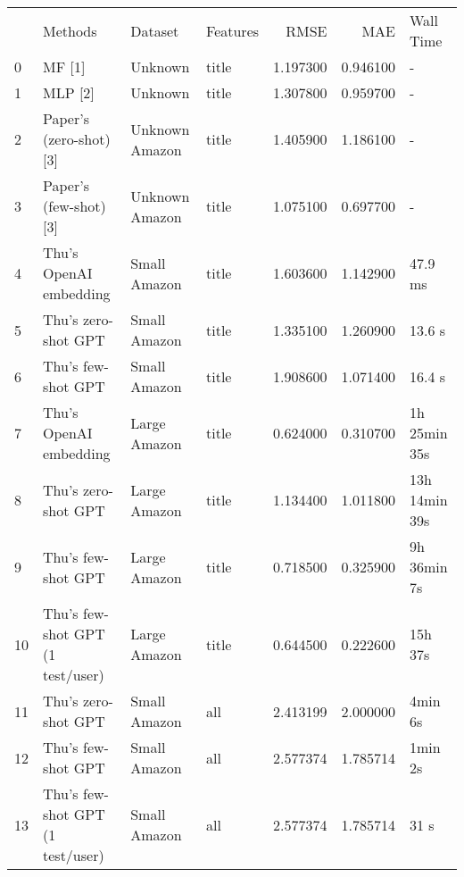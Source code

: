 \begin{tabular}{llllrrl}
 & Methods & Dataset & Features & RMSE & MAE & Wall Time \\
0 & MF [1] & Unknown & title & 1.197300 & 0.946100 & - \\
1 & MLP [2] & Unknown & title & 1.307800 & 0.959700 & - \\
2 & Paper's (zero-shot) [3] & Unknown Amazon & title & 1.405900 & 1.186100 & - \\
3 & Paper's (few-shot) [3] & Unknown Amazon & title & 1.075100 & 0.697700 & - \\
4 & Thu's OpenAI embedding & Small Amazon & title & 1.603600 & 1.142900 & 47.9 ms \\
5 & Thu's zero-shot GPT & Small Amazon & title & 1.335100 & 1.260900 & 13.6 s \\
6 & Thu's few-shot GPT & Small Amazon & title & 1.908600 & 1.071400 & 16.4 s \\
7 & Thu's OpenAI embedding & Large Amazon & title & 0.624000 & 0.310700 & 1h 25min 35s \\
8 & Thu's zero-shot GPT & Large Amazon & title & 1.134400 & 1.011800 & 13h 14min 39s \\
9 & Thu's few-shot GPT & Large Amazon & title & 0.718500 & 0.325900 & 9h 36min 7s \\
10 & Thu's few-shot GPT (1 test/user) & Large Amazon & title & 0.644500 & 0.222600 & 15h 37s \\
11 & Thu's zero-shot GPT & Small Amazon & all & 2.413199 & 2.000000 & 4min 6s \\
12 & Thu's few-shot GPT & Small Amazon & all & 2.577374 & 1.785714 & 1min 2s \\
13 & Thu's few-shot GPT (1 test/user) & Small Amazon & all & 2.577374 & 1.785714 & 31 s \\
\end{tabular}
